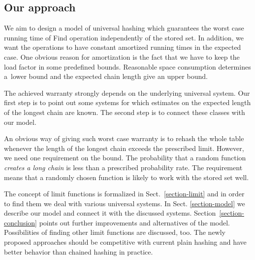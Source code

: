 \subsection{Our approach}
We aim to design a model of universal hashing which guarantees the worst case running time of Find operation independently of the stored set. In addition, we want the operations to have constant amortized running times in the expected case. One obvious reason for amortization is the fact that we have to keep the load factor in some predefined bounds. Reasonable space consumption determines a~lower bound and the expected chain length give an upper bound.

The achieved warranty strongly depends on the underlying universal system. Our first step is to point out some systems for which estimates on the expected length of the longest chain are known. The second step is to connect these classes with our model.

An obvious way of giving such worst case warranty is to rehash the whole table whenever the length of the longest chain exceeds the prescribed limit. However, we need one requirement on the bound. The probability that a random function \emph{creates a long chain} is less than a prescribed probability rate. The requirement means that a randomly chosen function is likely to work with the stored set well.

The concept of limit functions is formalized in Sect.~\ref{section-limit} and in order to find them we deal with various universal systems. In Sect. \ref{section-model} we describe our model and connect it with the discussed systems. Section~\ref{section-conclusion} points out further improvements and alternatives of the model. Possibilities of finding other limit functions are discussed, too. The newly proposed approaches should be competitive with current plain hashing and have better behavior than chained hashing in practice.
